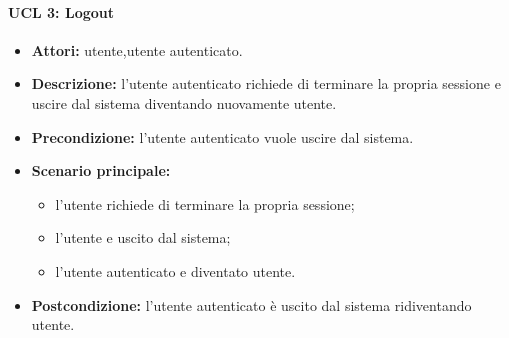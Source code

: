 \paragraph{UCL 3: Logout}
\begin{itemize}
	\item \textbf{Attori:} utente,utente autenticato.
	\item \textbf{Descrizione:} l'utente autenticato richiede di terminare la propria sessione e uscire
	dal sistema diventando nuovamente utente.
	\item \textbf{Precondizione:} l'utente autenticato vuole uscire dal sistema.
	\item \textbf{Scenario principale:}
	\begin{itemize}
		\item l'utente richiede di terminare la propria sessione;
		\item l'utente e uscito dal sistema;
		\item l'utente autenticato e diventato utente.
	\end{itemize}
	\item \textbf{Postcondizione:} l'utente autenticato è uscito dal sistema ridiventando utente.
\end{itemize}